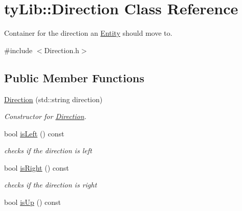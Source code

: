 \hypertarget{classty_lib_1_1_direction}{}\section{ty\+Lib\+:\+:Direction Class Reference}
\label{classty_lib_1_1_direction}


Container for the direction an \hyperlink{classty_lib_1_1_entity}{Entity} should move to.  




{\ttfamily \#include $<$Direction.\+h$>$}

\subsection*{Public Member Functions}
\begin{DoxyCompactItemize}
\item 
\hypertarget{classty_lib_1_1_direction_a6c231415d720254364d15ba85bd95e0f}{}\hyperlink{classty_lib_1_1_direction_a6c231415d720254364d15ba85bd95e0f}{Direction} (std\+::string direction)\label{classty_lib_1_1_direction_a6c231415d720254364d15ba85bd95e0f}

\begin{DoxyCompactList}\small\item\em Constructor for \hyperlink{classty_lib_1_1_direction}{Direction}. \end{DoxyCompactList}\item 
\hypertarget{classty_lib_1_1_direction_a7e4b65251d40645730e8425ae71d9052}{}bool \hyperlink{classty_lib_1_1_direction_a7e4b65251d40645730e8425ae71d9052}{is\+Left} () const \label{classty_lib_1_1_direction_a7e4b65251d40645730e8425ae71d9052}

\begin{DoxyCompactList}\small\item\em checks if the direction is left \end{DoxyCompactList}\item 
\hypertarget{classty_lib_1_1_direction_a3b888b244b8ad23a5c9a8fbcda1759ab}{}bool \hyperlink{classty_lib_1_1_direction_a3b888b244b8ad23a5c9a8fbcda1759ab}{is\+Right} () const \label{classty_lib_1_1_direction_a3b888b244b8ad23a5c9a8fbcda1759ab}

\begin{DoxyCompactList}\small\item\em checks if the direction is right \end{DoxyCompactList}\item 
\hypertarget{classty_lib_1_1_direction_a28c5827ec0b5ecd56c2bf93499a75c0e}{}bool \hyperlink{classty_lib_1_1_direction_a28c5827ec0b5ecd56c2bf93499a75c0e}{is\+Up} () const \label{classty_lib_1_1_direction_a28c5827ec0b5ecd56c2bf93499a75c0e}


\end{DoxyCompactItemize}
